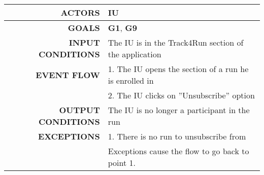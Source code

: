 \begin{table}[h!]
\begin{tabular}{|r|p{3in}|}
\hline
\textbf{ACTORS} & IU\\
\hline
\textbf{GOALS} & \textbf{G1},  \textbf{G9} \\
\hline
\textbf{INPUT CONDITIONS} & The IU is in the Track4Run section of the application\\
\hline
\textbf{EVENT FLOW} 
&1. The IU opens the section of a run he is enrolled in \\
&2. The IU clicks on ''Unsubscribe'' option\\
\hline
\textbf{OUTPUT CONDITIONS} & The IU is no longer a participant in the run\\
\hline
\textbf{EXCEPTIONS} 
&1. There is no run to unsubscribe from\\
&Exceptions cause the flow to go back to point 1.\\
\hline
\end{tabular}
\end{table}